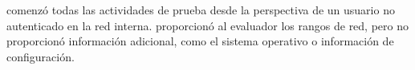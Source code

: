 \qquad \brandName comenzó todas las actividades de prueba desde la perspectiva de un usuario no autenticado en la red interna. \enterpriseName proporcionó al evaluador los rangos de red, pero no proporcionó información adicional, como el sistema operativo o información de configuración.
